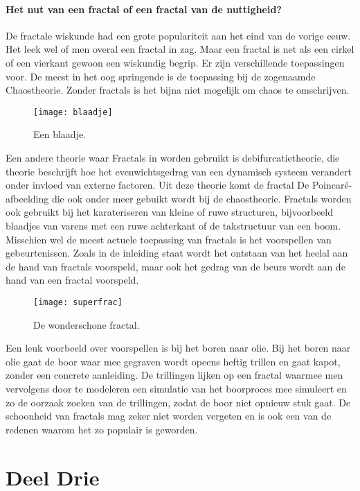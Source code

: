 \documentclass[11pt,fleqn]{book} %
\begin{document}
\subsection{Het nut van een fractal of een fractal van de nuttigheid?}
De fractale wiskunde had een grote populariteit aan het eind van de vorige eeuw. Het leek wel of men overal een fractal in zag. Maar een fractal is net als een cirkel of een vierkant gewoon een wiskundig begrip. Er zijn verschillende toepassingen voor. De meest in het oog springende is de toepassing bij de zogenaamde Chaostheorie. Zonder fractals is het bijna niet mogelijk om chaos te omschrijven.
\begin{figure}[h]
	\centering\texttt{[image: blaadje]}
	\caption{Een blaadje.}
	\label{fig:blaadje}
\end{figure}
Een andere theorie waar Fractals in worden gebruikt is debifurcatietheorie, die theorie beschrijft hoe het evenwichtsgedrag van een dynamisch systeem verandert onder invloed van externe factoren. Uit deze theorie komt de fractal De Poincaré-afbeelding die ook onder meer gebuikt wordt bij de chaostheorie. 
Fractals worden ook gebruikt bij het karateriseren van kleine of ruwe structuren, bijvoorbeeld blaadjes van varens met een ruwe achterkant of de takstructuur van een boom. Misschien wel de meest actuele toepassing van fractals is het voorspellen van gebeurtenissen. Zoals in de inleiding staat wordt het ontstaan van het heelal aan de hand van fractals voorspeld, maar ook het gedrag van de beurs wordt aan de hand van een fractal voorspeld.
\begin{figure}[h]
	\centering\texttt{[image: superfrac]}
	\caption{De wonderschone fractal.}
	\label{fig:superfrac}
\end{figure} 
Een leuk voorbeeld over voorspellen is bij het boren naar olie. Bij het boren naar olie gaat de boor waar mee gegraven wordt opeens heftig trillen en gaat kapot, zonder een concrete aanleiding. De trillingen lijken op een fractal waarmee men vervolgens door te modeleren een simulatie van het boorproces mee simuleert en zo de oorzaak zoeken van de trillingen, zodat de boor niet opnieuw stuk gaat.
De schoonheid van fractals mag zeker niet worden vergeten en is ook een van de redenen waarom het zo populair is geworden.


\part{Deel Drie}
\end{document}

